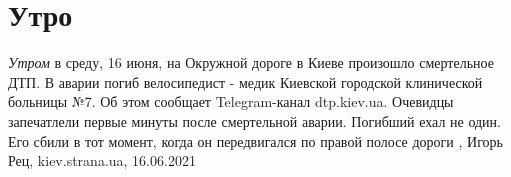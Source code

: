  
 
 
 
 
\chapter{Утро}

\emph{Утром} в среду, 16 июня, на Окружной дороге в Киеве произошло смертельное ДТП. В
аварии погиб велосипедист - медик Киевской городской клинической больницы №7.
Об этом сообщает Telegram-канал dtp.kiev.ua.  Очевидцы запечатлели первые
минуты после смертельной аварии. Погибший ехал не один. Его сбили в тот момент,
когда он передвигался по правой полосе дороги
,
Игорь Рец, kiev.strana.ua, 16.06.2021

